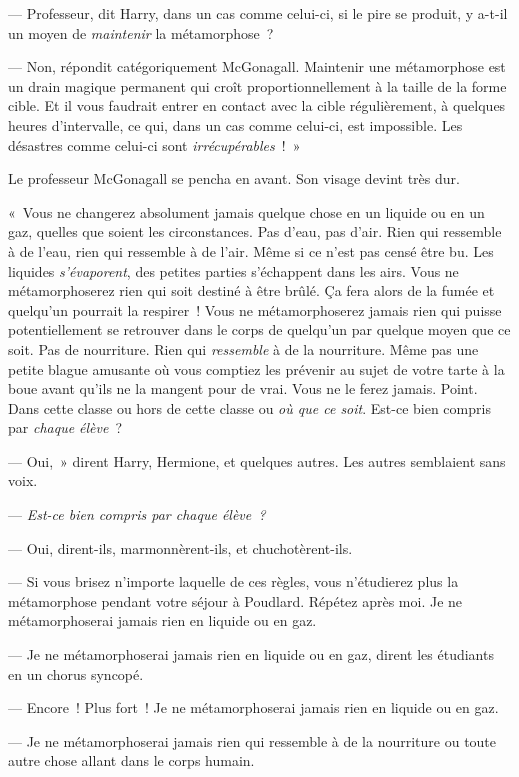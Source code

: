 --- Professeur, dit Harry, dans un cas comme celui-ci, si le pire se produit, y a-t-il un moyen de \emph{maintenir} la métamorphose~?

--- Non, répondit catégoriquement McGonagall. Maintenir une métamorphose est un drain magique permanent qui croît proportionnellement à la taille de la forme cible. Et il vous faudrait entrer en contact avec la cible régulièrement, à quelques heures d'intervalle, ce qui, dans un cas comme celui-ci, est impossible. Les désastres comme celui-ci sont \emph{irrécupérables}~!~»

Le professeur McGonagall se pencha en avant. Son visage devint très dur.

«~Vous ne changerez absolument jamais quelque chose en un liquide ou en un gaz, quelles que soient les circonstances. Pas d'eau, pas d'air. Rien qui ressemble à de l'eau, rien qui ressemble à de l'air. Même si ce n'est pas censé être bu. Les liquides \emph{s'évaporent}, des petites parties s'échappent dans les airs. Vous ne métamorphoserez rien qui soit destiné à être brûlé. Ça fera alors de la fumée et quelqu'un pourrait la respirer~! Vous ne métamorphoserez jamais rien qui puisse potentiellement se retrouver dans le corps de quelqu'un par quelque moyen que ce soit. Pas de nourriture. Rien qui \emph{ressemble} à de la nourriture. Même pas une petite blague amusante où vous comptiez les prévenir au sujet de votre tarte à la boue avant qu'ils ne la mangent pour de vrai. Vous ne le ferez jamais. Point. Dans cette classe ou hors de cette classe ou \emph{où que ce soit}. Est-ce bien compris par \emph{chaque élève}~?

--- Oui,~» dirent Harry, Hermione, et quelques autres. Les autres semblaient sans voix.

--- \emph{Est-ce bien compris par chaque élève~?}

--- Oui, dirent-ils, marmonnèrent-ils, et chuchotèrent-ils.

--- Si vous brisez n'importe laquelle de ces règles, vous n'étudierez plus la métamorphose pendant votre séjour à Poudlard. Répétez après moi. Je ne métamorphoserai jamais rien en liquide ou en gaz.

--- Je ne métamorphoserai jamais rien en liquide ou en gaz, dirent les étudiants en un chorus syncopé.

--- Encore~! Plus fort~! Je ne métamorphoserai jamais rien en liquide ou en gaz.

--- Je ne métamorphoserai jamais rien qui ressemble à de la nourriture ou toute autre chose allant dans le corps humain.

